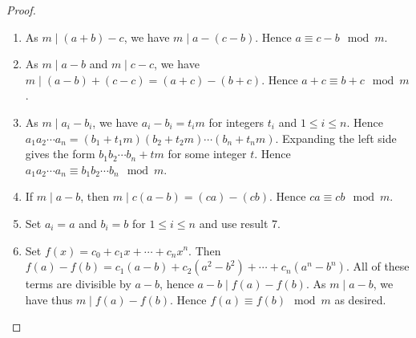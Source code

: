 \begin{pr}
\begin{proof}
\begin{enumerate}
\item As $m\mid (a+b)-c$, we have $m\mid a-(c-b)$.  Hence $a\equiv c-b\mod{m}$.
\item As $m\mid a-b$ and $m\mid c-c$, we have $m\mid (a-b)+(c-c) = (a+c)-(b+c)$.  Hence $a+c\equiv b+c\mod{m}$.
\item As $m\mid a_i-b_i$, we have $a_i-b_i = t_im$ for integers $t_i$ and $1 \le i \le n$.  Hence $a_1a_2\cdots a_n = (b_1+t_1m)(b_2+t_2m)\cdots(b_n+t_nm)$.  Expanding the left side gives the form $b_1b_2\cdots b_n + tm$ for some integer $t$.  Hence $a_1a_2\cdots a_n\equiv b_1b_2\cdots b_n\mod{m}$.
\item If $m\mid a-b$, then $m\mid c(a-b) = (ca)-(cb)$.  Hence $ca \equiv cb\mod{m}$.
\item Set $a_i = a$ and $b_i = b$ for $1 \le i \le n$ and use result 7.
\item Set $f(x) = c_0+c_1x+\cdots+c_nx^n$.  Then $f(a)-f(b) = c_1(a-b)+c_2(a^2-b^2)+\cdots+c_n(a^n-b^n)$.  All of these terms are divisible by $a-b$, hence $a-b \mid f(a)-f(b)$.  As $m \mid a-b$, we have thus $m \mid f(a)-f(b)$.  Hence $f(a)\equiv f(b)\mod{m}$ as desired.
\end{enumerate}
\end{proof}
\end{pr}
